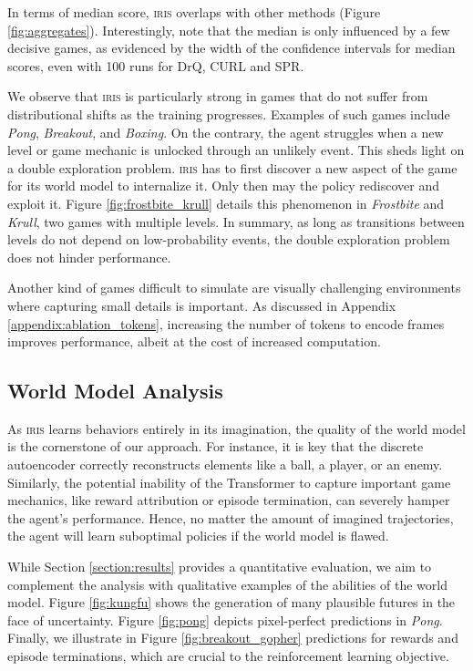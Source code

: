 In terms of median score, \textsc{iris} overlaps with other methods (Figure \ref{fig:aggregates}). Interestingly, \citet{spr} note that the median is only influenced by a few decisive games, as evidenced by the width of the confidence intervals for median scores, even with 100 runs for DrQ, CURL and SPR. 

We observe that \textsc{iris} is particularly strong in games that do not suffer from distributional shifts as the training progresses. Examples of such games include \textit{Pong}, \textit{Breakout}, and \textit{Boxing}. On the contrary, the agent struggles when a new level or game mechanic is unlocked through an unlikely event. This sheds light on a double exploration problem. \textsc{iris} has to first discover a new aspect of the game for its world model to internalize it. Only then may the policy rediscover and exploit it. Figure \ref{fig:frostbite_krull} details this phenomenon in \textit{Frostbite} and \textit{Krull}, two games with multiple levels. In summary, as long as transitions between levels do not depend on low-probability events, the double exploration problem does not hinder performance. 

Another kind of games difficult to simulate are visually challenging environments where capturing small details is important. As discussed in Appendix \ref{appendix:ablation_tokens}, increasing the number of tokens to encode frames improves performance, albeit at the cost of increased computation.

\subsection{World Model Analysis}
\label{section:analysis}

As \textsc{iris} learns behaviors entirely in its imagination, the quality of the world model is the cornerstone of our approach. For instance, it is key that the discrete autoencoder correctly reconstructs elements like a ball, a player, or an enemy. Similarly, the potential inability of the Transformer to capture important game mechanics, like reward attribution or episode termination, can severely hamper the agent's performance. Hence, no matter the amount of imagined trajectories, the agent will learn suboptimal policies if the world model is flawed.

While Section \ref{section:results} provides a quantitative evaluation, we aim to complement the analysis with qualitative examples of the abilities of the world model. Figure \ref{fig:kungfu} shows the generation of many plausible futures in the face of uncertainty. Figure \ref{fig:pong} depicts pixel-perfect predictions in \textit{Pong}. Finally, we illustrate in Figure \ref{fig:breakout_gopher} predictions for rewards and episode terminations, which are crucial to the reinforcement learning objective.






